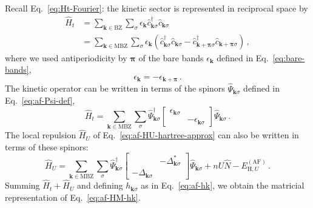 \begin{tabproof}
	
	Recall Eq.~\eqref{eq:Ht-Fourier}: the kinetic sector is represented in reciprocal space by
	\[
	\begin{aligned}
		\hat H_t &= \sum_{\mathbf{k} \in \mathrm{BZ}} \sum_\sigma \epsilon_\mathbf{k} \hat c_{\mathbf{k}\sigma}^\dagger \hat c_{\mathbf{k}\sigma} \\ 
		&= \sum_{\mathbf{k} \in \mathrm{MBZ}} \sum_\sigma \epsilon_\mathbf{k} \left(\hat c_{\mathbf{k}\sigma}^\dagger \hat c_{\mathbf{k}\sigma} - \hat c_{\mathbf{k}+\bm{\pi}\sigma}^\dagger \hat c_{\mathbf{k}+\bm{\pi}\sigma}\right) \, ,
	\end{aligned}
	\]
	where we used antiperiodicity by $\bm{\pi}$ of the bare bands $\epsilon_\mathbf{k}$ defined in Eq.~\eqref{eq:bare-bands},
	\[
	\epsilon_\mathbf{k} = -\epsilon_{\mathbf{k}+\bm{\pi}} \, .
	\]
	The kinetic operator can be written in terms of the spinors $\hat \Psi_{\mathbf{k}\sigma}$ defined in Eq.~\eqref{eq:af-Psi-def},
	\[
	\hat H_t = \sum_{\mathbf{k} \in \mathrm{MBZ}} \sum_\sigma \hat \Psi_{\mathbf{k}\sigma}^\dagger \begin{bmatrix}
		\epsilon_{\mathbf{k}\sigma} & \\ & -\epsilon_{\mathbf{k}\sigma}
	\end{bmatrix} \hat \Psi_{\mathbf{k}\sigma} \, .
	\]
	The local repulsion $\hat H_U$ of Eq.~\eqref{eq:af-HU-hartree-approx} can also be written in terms of these spinors:
	\[
	\hat H_U = \sum_{\mathbf{k} \in  \mathrm{MBZ}} \sum_\sigma \hat \Psi_{\mathbf{k}\sigma}^\dagger \begin{bmatrix}
		& -\Delta_{\mathbf{k}\sigma}^* \\  -\Delta_{\mathbf{k}\sigma} & 
	\end{bmatrix} \hat \Psi_{\mathbf{k}\sigma}  + nU \hat N - E_{\mathrm{H},U}^{(\mathrm{AF})} \, .
	\]
	Summing $\hat H_t + \hat H_U$ and defining $h_{\mathbf{k}\sigma}$ as in Eq.~\eqref{eq:af-hk}, we obtain the matricial representation of Eq.~\eqref{eq:af-HM-hk}.
\end{tabproof}


